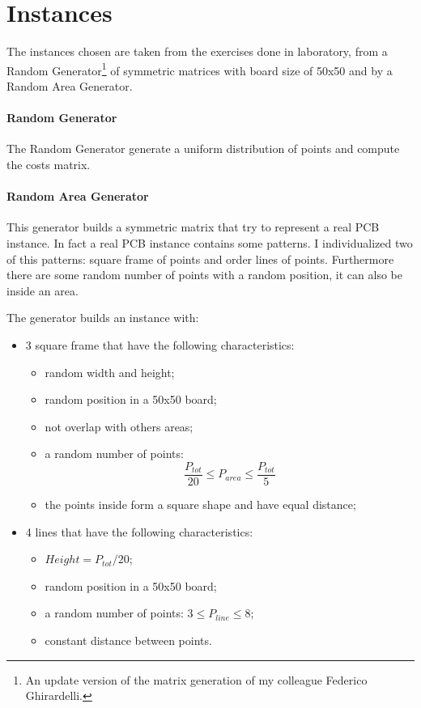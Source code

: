 \section{Instances}
	The instances chosen are taken from the exercises done in laboratory, from a Random Generator\footnote{An update version of the matrix generation of my colleague Federico Ghirardelli.} of symmetric matrices with board size of 50x50 and by a Random Area Generator.
	
	\paragraph{Random Generator} The Random Generator generate a uniform distribution of points and compute the costs matrix.
	
	\paragraph{Random Area Generator} This generator builds a symmetric matrix that try to represent a real PCB instance. In fact a real PCB instance contains some patterns. I individualized two of this patterns: square frame of points and order lines of points. Furthermore there are some random number of points with a random position, it can also be inside an area. 
	
	The generator builds an instance with:
	\begin{itemize}
		\item 3 square frame that have the following characteristics:
			\begin{itemize}
				\item random width and height;
				\item random position in a 50x50 board;
				\item not overlap with others areas;
				\item a random number of points:
				\begin{equation*}
					\frac{P_{tot}}{20} \leq P_{area} \leq \frac{P_{tot}}{5}  
				\end{equation*}
				\item the points inside form a square shape and have equal distance;
			\end{itemize}
		\item 4 lines that have the following characteristics:
			\begin{itemize}
				\item $Height = P_{tot} / 20$;
				\item random position in a 50x50 board;
				\item a random number of points: $3 \leq P_{line} \leq 8$;
				\item constant distance between points.
			\end{itemize}
	\end{itemize}

